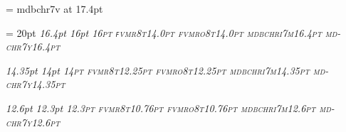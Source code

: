 \def\ttfontprefix{fvm}

\def\ttshape{r8t}
\def\ttbshape{b8t}
\def\ttslshape{ro8t}
\def\ttbslshape{bo8t}

\def\mtfontprefix{md}

\def\mtitshape{bchri7m}			%
\def\mtsyshape{-chr7y}			%
\font\elevenex=  mdbchr7v at 17.4pt 	%

\ifx\bigger\relax
  \def\textfontsize{17.4pt}
  \setfont\textrm\rmfontprefix\rmshape{\textfontsize}
\else
  \def\textfontsize{16pt}
  \textleading = 20pt 
  \setfont\textrm\rmfontprefix\rmshape{\textfontsize}
\fi
\setfont\textbf\rmfontprefix\bfshape{\textfontsize}
\setfont\textit\rmfontprefix\itshape{16.4pt}		%
\setfont\textsl\rmfontprefix\slshape{\textfontsize}
\setfont\textsc\rmfontprefix\scshape{\textfontsize}
\setfont\texttt\ttfontprefix\ttshape{14.0pt}		%
\setfont\textttsl\ttfontprefix\ttslshape{14.0pt}	%
\setfont\texti\mtfontprefix\mtitshape{16.4pt}		%
\setfont\textsy\mtfontprefix\mtsyshape{16.4pt}		%

\setfont{}\rmfontprefix\bxshape{14.5pt} %
\def\df{\let\tentt=\deftt \let\tenbf = \defbf \bf}

\def\smallfontsize{14pt}		%
\setfont\smallrm\rmfontprefix\rmshape{\smallfontsize}
\setfont\smallbf\rmfontprefix\bfshape{\smallfontsize}
\setfont\smallit\rmfontprefix\itshape{14.35pt}
\setfont\smallsl\rmfontprefix\slshape{\smallfontsize}
\setfont\smallsc\rmfontprefix\scshape{\smallfontsize}
\setfont\smalltt\ttfontprefix\ttshape{12.25pt}
\setfont\smallttsl\ttfontprefix\ttslshape{12.25pt}
\setfont\smalli\mtfontprefix\mtitshape{14.35pt}
\setfont\smallsy\mtfontprefix\mtsyshape{14.35pt}

\def\smallerfontsize{12.3pt}		%
\setfont\smallerrm\rmfontprefix\rmshape{\smallerfontsize}
\setfont\smallerbf\rmfontprefix\bfshape{\smallerfontsize}
\setfont\smallerit\rmfontprefix\itshape{12.6pt}
\setfont\smallersl\rmfontprefix\slshape{\smallerfontsize}
\setfont\smallersc\rmfontprefix\scshape{\smallerfontsize}
\setfont\smallertt\ttfontprefix\ttshape{10.76pt}
\setfont\smallerttsl\ttfontprefix\ttslshape{10.76pt}
\setfont\smalleri\mtfontprefix\mtitshape{12.6pt}
\setfont\smallersy\mtfontprefix\mtsyshape{12.6pt}

